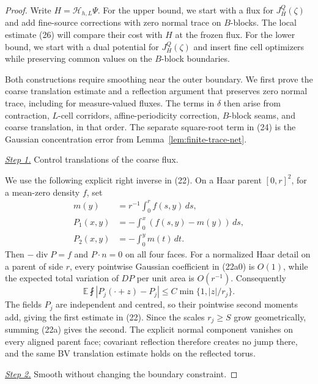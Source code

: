 \documentclass{aomart}
\theoremstyle{definition}
\newcommand{\1}{\mathbf 1}
\begin{document}
\begin{proof}
Write $H=\mathcal H_{h,L}\Psi$.  For the upper bound, we start with a
flux for $J_H^Q(\zeta)$ and add fine-source corrections with zero normal
trace on $B$-blocks.  The local estimate (26) will compare their cost
with $H$ at the frozen flux.  For the lower bound, we start with a dual
potential for $J_H^Q(\zeta)$ and insert fine cell optimizers while
preserving common values on the $B$-block boundaries.

Both constructions require smoothing near the outer boundary.  We first
prove the coarse translation estimate and a reflection argument that
preserves zero normal trace, including for measure-valued fluxes.  The
terms in $\delta$ then arise from contraction, $L$-cell corridors,
affine-periodicity correction, $B$-block seams, and coarse translation,
in that order.  The separate square-root term in (24) is the Gaussian
concentration error from Lemma~\ref{lem:finite-trace-net}.

\smallskip\noindent
\underline{\textit{Step 1.}} Control translations of the coarse flux.

We use the following explicit right inverse in (22).
On a Haar parent $[0,r]^2$, for a mean-zero density $f$, set
\begin{equation}
\begin{aligned}
m(y)&=r^{-1}\int_0^r f(s,y)\,ds,\\
P_1(x,y)&=-\int_0^x(f(s,y)-m(y))\,ds,\\
P_2(x,y)&=-\int_0^y m(t)\,dt.
\end{aligned}
\tag{22a0}
\end{equation}
Then $-\operatorname {div}P=f$ and $P\cdot n=0$ on all four
faces.  For a normalized Haar detail on a parent of side $r$, every
pointwise Gaussian coefficient in (22a0) is $O(1)$, while the expected
total variation of $DP$ per unit area is $O(r^{-1})$.
Consequently
\begin{equation}
\mathbb E\fint|P_ j(\cdot+z)-P_ j|
\leq C\min\{1,|z|/r_ j\}.
\tag{22a}
\end{equation}
The fields $P_ j$ are independent and centred, so their pointwise
second moments add, giving the first estimate in (22).  Since the
scales $r_ j\geq S$ grow geometrically, summing (22a) gives the second.
The explicit normal component vanishes on every aligned parent face;
covariant reflection therefore creates no jump there, and the same
BV translation estimate holds on the reflected torus.

\smallskip\noindent
\underline{\textit{Step 2.}} Smooth without changing the boundary constraint.


\end{proof}
\end{document}
